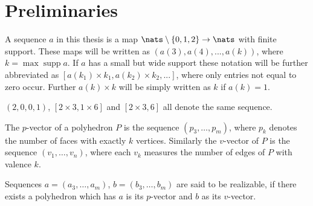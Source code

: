 \section{Preliminaries}

\begin{definition}[Sequence]
  A sequence $a$ in this thesis is a map $\nats \setminus \{0, 1, 2\} \rightarrow \nats$ with finite support. These maps will be written as $(a(3), a(4), ..., a(k))$, where $k = \operatorname{max} \operatorname{supp} a$. If $a$ has a small but wide support these notation will be further abbreviated as $[a(k_1) \times k_1, a(k_2) \times k_2, ...]$, where only entries not equal to zero occur. Further $a(k) \times k$ will be simply written as $k$ if $a(k) = 1$.
\end{definition}
\begin{example}
  $(2, 0, 0, 1)$, $[2 \times 3, 1 \times 6]$ and $[2 \times 3, 6]$ all denote the same sequence.
\end{example}
\begin{definition}\label{def:relizable}
  The $p$-vector of a polyhedron $P$ is the sequence $(p_3, \dots, p_m)$, where $p_k$ denotes the number of faces with exactly $k$ vertices. Similarly the $v$-vector of $P$ is the sequence $(v_1, \dots, v_n)$, where each $v_k$ measures the number of edges of $P$ with valence $k$.
\end{definition}

\begin{definition}\label{def:realizable}
  Sequences $a = (a_3, \dots, a_m)$, $b = (b_3, \dots, b_m)$ are said to be realizable, if there exists a polyhedron which has $a$ is its $p$-vector and $b$ as its $v$-vector.
\end{definition}

